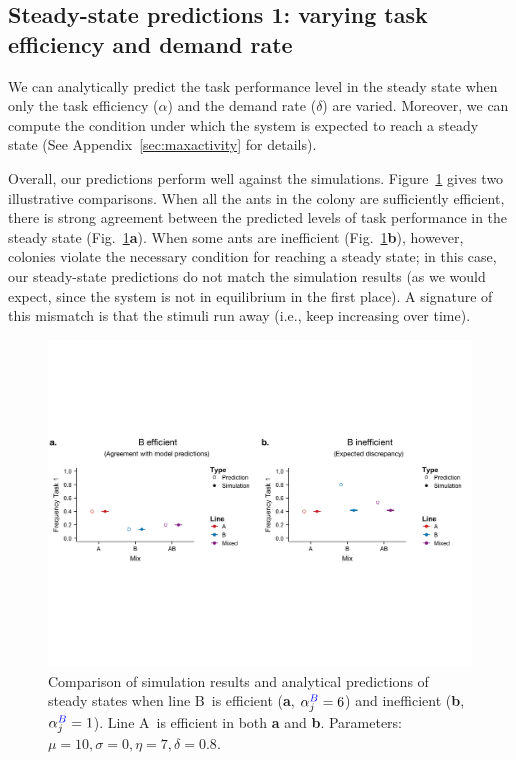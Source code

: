\documentclass[11pt]{article}
\newcommand{\A}{{\color{red}A}}
\newcommand{\B}{{\color{blue}B}}
\begin{document}
\subsection{Steady-state predictions 1: varying task efficiency and demand rate} \label{sec:sspred1}
We can analytically predict the task performance level in the steady state when only the task efficiency ($\alpha$) and the demand rate ($\delta$) are varied. Moreover, we can compute the condition under which the system is expected to reach a steady state (See Appendix~\ref{sec:maxactivity} for details). 

Overall, our predictions perform well against the simulations. Figure~\ref{fig:5050_comp} gives two illustrative comparisons. When all the ants in the colony are sufficiently efficient, there is strong agreement between the predicted levels of task performance in the steady state (Fig.~\ref{fig:5050_comp}\textbf{a}). When some ants are inefficient (Fig.~\ref{fig:5050_comp}\textbf{b}), however, colonies violate the necessary condition for reaching a steady state; in this case, our steady-state predictions do not match the simulation results (as we would expect, since the system is not in equilibrium in the first place). A signature of this mismatch is that the stimuli run away (i.e., keep increasing over time).
\begin{figure}[H]
    \centering
    \includegraphics[trim={0 2.5in 0 2.4in}, clip, width=1\linewidth]{doc/model_comparison_deltaalpha.pdf}
    \caption{Comparison of simulation results and analytical predictions of steady states when line \B\ is efficient (\textbf{a}, $\alpha_j^{\B} = 6$) and inefficient (\textbf{b}, $\alpha_j^{\B} = 1$). Line \A\ is efficient in both \textbf{a} and \textbf{b}. Parameters: $\mu = 10, \sigma = 0, \eta = 7, \delta = 0.8$. }
    \label{fig:5050_comp}
\end{figure}
\end{document}
